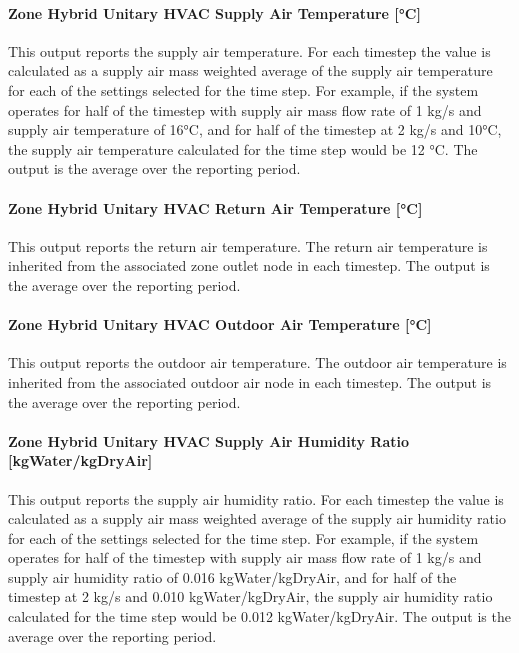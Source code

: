 \paragraph{Zone Hybrid Unitary HVAC Supply Air Temperature [\si{\degreeCelsius}]}
This output reports the supply air temperature. For each timestep the value is calculated as a supply air mass weighted average of the supply air temperature for each of the settings selected for the time step. For example, if the system operates for half of the timestep with supply air mass flow rate of 1 kg/s and supply air temperature of 16\si{\degreeCelsius}, and for half of the timestep at 2 kg/s and 10\si{\degreeCelsius}, the supply air temperature calculated for the time step would be 12 \si{\degreeCelsius}. The output is the average over the reporting period.

\paragraph{Zone Hybrid Unitary HVAC Return Air Temperature [\si{\degreeCelsius}]}
This output reports the return air temperature. The return air temperature is inherited from the associated zone outlet node in each timestep. The output is the average over the reporting period.

\paragraph{Zone Hybrid Unitary HVAC Outdoor Air Temperature [\si{\degreeCelsius}]}
This output reports the outdoor air temperature.  The outdoor air temperature is inherited from the associated outdoor air node in each timestep.  The output is the average over the reporting period.

\paragraph{Zone Hybrid Unitary HVAC Supply Air Humidity Ratio [kgWater/kgDryAir]}
This output reports the supply air humidity ratio. For each timestep the value is calculated as a supply air mass weighted average of the supply air humidity ratio for each of the settings selected for the time step. For example, if the system operates for half of the timestep with supply air mass flow rate of 1 kg/s and supply air humidity ratio of 0.016 kgWater/kgDryAir, and for half of the timestep at 2 kg/s and 0.010 kgWater/kgDryAir, the supply air humidity ratio calculated for the time step would be 0.012 kgWater/kgDryAir. The output is the average over the reporting period.

